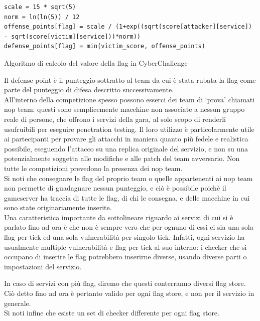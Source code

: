 \begin{listing}[H]
\begin{verbatim}
scale = 15 * sqrt(5) 
norm = ln(ln(5)) / 12 
offense_points[flag] = scale / (1+exp((sqrt(score[attacker][service]) - sqrt(score[victim][service]))*norm))
defense_points[flag] = min(victim_score, offense_points)
\end{verbatim}
\caption{Algoritmo di calcolo del valore della flag in CyberChallenge}\label{lst:flagcalc}
\end{listing}

Il defense point è il punteggio sottratto al team da cui è stata rubata la flag come parte del punteggio di difesa descritto successivamente.\\

All'interno della competizione spesso possono esserci dei team di `prova' chiamati \gls{nop} team: questi sono semplicemente macchine non associate a nessun gruppo reale di persone, che offrono i servizi della gara, al solo scopo di renderli usufruibili per eseguire penetration testing. Il loro utilizzo è particolarmente utile ai partecipanti per provare gli attacchi in maniera quanto più fedele e realistica possibile, eseguendo l'attacco su una replica originale del servizio, e non su una potenzialmente soggetta alle modifiche e alle patch del team avversario. Non tutte le competizioni prevedono la presenza dei \gls{nop} team.\\

Si noti che consegnare le flag del proprio team o quelle appartenenti ai \gls{nop} team non permette di guadagnare nessun punteggio, e ciò è possibile poichè il gameserver ha traccia di tutte le flag, di chi le consegna, e delle macchine in cui sono state originariamente inserite.\\
Una caratteristica importante da sottolineare riguardo ai servizi di cui si è parlato fino ad ora è che non è sempre vero che per ognuno di essi ci sia una sola flag per tick ed una sola vulnerabilità per singolo tick. Infatti, ogni servizio ha usualmente multiple vulnerabilità e flag per tick al suo interno: i checker che si occupano di inserire le flag potrebbero inserirne diverse, usando diverse parti o impostazioni del servizio.

In caso di servizi con più flag, diremo che questi conterranno diversi flag store. Ciò detto fino ad ora è pertanto valido per ogni flag store, e non per il servizio in generale.\\
Si noti infine che esiste un set di checker differente per ogni flag store.

